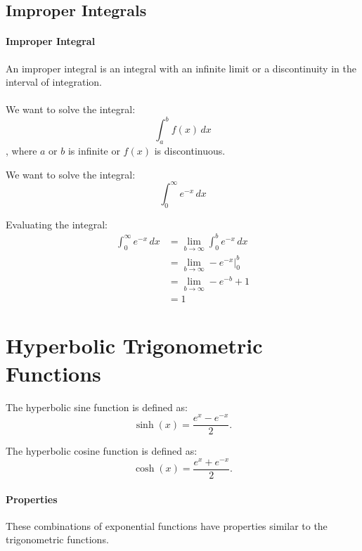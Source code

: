\documentclass[11pt]{article}
\begin{document}
\subsection{Improper Integrals}
\paragraph{Improper Integral} An improper integral is an integral with an infinite limit or a discontinuity in the interval of integration.
\paragraph{} We want to solve the integral:
\begin{equation}
    \int_a^b f(x) \, dx
\end{equation}
, where $a$ or $b$ is infinite or $f(x)$ is discontinuous.
\begin{example}
We want to solve the integral:
$$ \int_0^\infty e^{-x} \, dx $$

Evaluating the integral:
\begin{align*}
    \int_0^\infty e^{-x} \, dx &= \lim_{b \to \infty} \int_0^b e^{-x} \, dx \\
    &= \lim_{b \to \infty} -e^{-x} \Big|_0^b \\
    &= \lim_{b \to \infty} -e^{-b} + 1 \\
    &= 1
\end{align*}
\end{example}
\section{Hyperbolic Trigonometric Functions}
\begin{definition}
    The hyperbolic sine function is defined as:
    \begin{equation} \sinh(x) = \frac{e^x - e^{-x}}{2}. \end{equation}
\end{definition}
\begin{definition}
    The hyperbolic cosine function is defined as:
    \begin{equation}  \cosh(x) = \frac{e^x + e^{-x}}{2}. \end{equation}
\end{definition}
\paragraph{Properties} These combinations of exponential functions have properties similar to the trigonometric functions.
\end{document}

